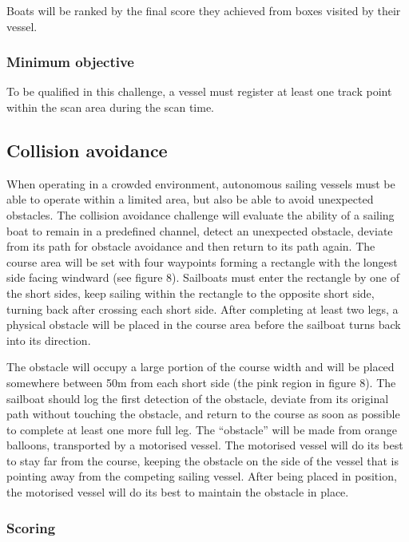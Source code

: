 \documentclass[12pt]{article}
\begin{document}
Boats will be ranked by the final score they achieved from boxes visited by
their vessel.

\subsubsection{Minimum objective}
To be qualified in this challenge, a vessel must register at least one track
point within the scan area during the scan time.

\subsection{Collision avoidance}
When operating in a crowded environment, autonomous sailing vessels must be able
to operate within a limited area, but also be able to avoid unexpected
obstacles. The collision avoidance challenge will evaluate the ability of a 
sailing boat to remain in a predefined channel, detect an unexpected obstacle, 
deviate from its path for obstacle avoidance and then return to its path again.
 The course area will be set with four waypoints forming a rectangle with the 
 longest side facing windward (see figure
8). 
Sailboats must enter the rectangle by one of the short sides, keep
sailing within the
rectangle to the opposite short side, turning back after crossing each short
side. After
completing at least two legs, a physical obstacle will be placed in the course
area before the
sailboat turns back into its direction.

The obstacle will occupy a large portion of the course width and will be placed
somewhere between 50m from each short side (the pink region in figure 8). 
The sailboat should log the first detection of the obstacle, deviate from its
original path without touching the obstacle, and return to the course as soon 
as possible to complete at least one more full leg. 
The “obstacle” will be made from orange balloons, transported by a motorised
vessel. The motorised vessel will do its best to stay far from the course,
keeping the obstacle on the side of the vessel that is pointing away from the
competing sailing vessel. After being placed in
position, the motorised vessel will do its best to maintain the obstacle in place.

\subsubsection{Scoring}
\end{document}
